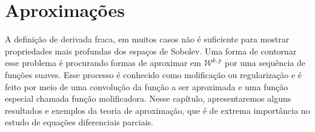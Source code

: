 \documentclass[a4paper, 11pt]{book}
\theoremstyle{definition}
\newcommand{\cW}{\mathcal{W}}
\begin{document}
\section{Aproximações} \label{sec:aproximacoes}


A definição de derivada fraca, em muitos casos não é suficiente para mostrar propriedades mais profundas dos espaços de Sobolev.
Uma forma de contornar esse problema é procurando formas de aproximar em $\cW^{k,p}$ por uma sequência de funções suaves.
Esse processo é conhecido como molificação ou regularização e é feito por meio de uma convolução da função a ser aproximada e uma função especial chamada função molificadora. 
Nesse capítulo, apresentaremos alguns resultados e exemplos da teoria de aproximação, que é de extrema importância no estudo de equações diferenciais parciais.
\end{document}
